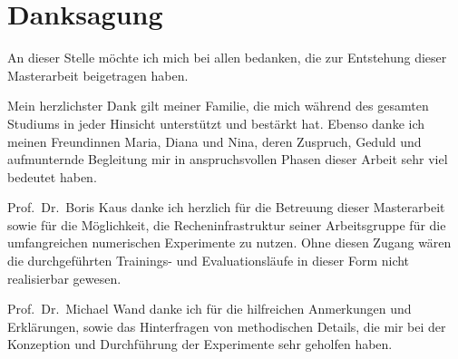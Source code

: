 
\chapter*{Danksagung}

An dieser Stelle möchte ich mich bei allen bedanken, die zur Entstehung dieser
Masterarbeit beigetragen haben.

Mein herzlichster Dank gilt meiner Familie, die mich während des gesamten
Studiums in jeder Hinsicht unterstützt und bestärkt hat. Ebenso danke ich
meinen Freundinnen Maria, Diana und Nina, deren Zuspruch, Geduld und aufmunternde
Begleitung mir in anspruchsvollen Phasen dieser Arbeit sehr viel bedeutet
haben.

Prof.~Dr.~Boris Kaus danke ich herzlich für die Betreuung dieser Masterarbeit
sowie für die Möglichkeit, die Recheninfrastruktur seiner Arbeitsgruppe für die
umfangreichen numerischen Experimente zu nutzen. Ohne diesen Zugang wären die
durchgeführten Trainings- und Evaluationsläufe in dieser Form nicht realisierbar
gewesen.

Prof.~Dr.~Michael Wand danke ich für die hilfreichen Anmerkungen und Erklärungen, sowie das Hinterfragen von methodischen Details, die mir bei der Konzeption und Durchführung der Experimente sehr geholfen haben.